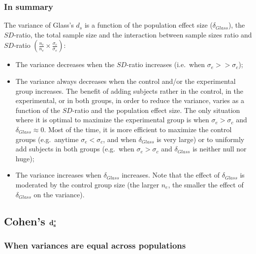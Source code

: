 \documentclass[
  english,
  man]{apa6}
\providecommand{\tightlist}{%
  \setlength{\itemsep}{0pt}\setlength{\parskip}{0pt}}
\begin{document}
\hypertarget{in-summary-1}{%
\subsubsection{In summary}\label{in-summary-1}}

The variance of Glass's \(d_s\) is a function of the population effect size (\(\delta_{Glass}\)), the \(SD\)-ratio, the total sample size and the interaction between sample sizes ratio and \(SD\)-ratio \(\left(\frac{n_c}{n_e}\times\frac{\sigma_c}{\sigma_e} \right)\):

\begin{itemize}
\tightlist
\item
  The variance decreases when the \(SD\)-ratio increases (i.e.~when \(\sigma_e >> \sigma_c\));\\
\item
  The variance always decreases when the control and/or the experimental group increases. The benefit of adding subjects rather in the control, in the experimental, or in both groups, in order to reduce the variance, varies as a function of the \(SD\)-ratio and the population effect size. The only situation where it is optimal to maximize the experimental group is when \(\sigma_e > \sigma_c\) and \(\delta_{Glass} \approx 0\). Most of the time, it is more efficient to maximize the control groups (e.g.~anytime \(\sigma_e < \sigma_c\), and when \(\delta_{Glass}\) is very large) or to uniformly add subjects in both groups (e.g.~when \(\sigma_e > \sigma_c\) and \(\delta_{Glass}\) is neither null nor huge);
\item
  The variance increases when \(\delta_{Glass}\) increases. Note that the effect of \(\delta_{Glass}\) is moderated by the control group size (the larger \(n_e\), the smaller the effect of \(\delta_{Glass}\) on the variance).
\end{itemize}

\hypertarget{cohens-bf-d_s-1}{%
\subsection{\texorpdfstring{Cohen's \(\bf d^*_s\)}{Cohen's \textbackslash bf d\^{}*\_s}}\label{cohens-bf-d_s-1}}

\hypertarget{when-variances-are-equal-across-populations-2}{%
\subsubsection{When variances are equal across populations}\label{when-variances-are-equal-across-populations-2}}
\end{document}
